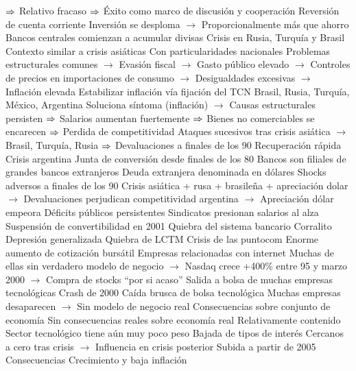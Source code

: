 \documentclass{nuevotema}
\begin{document}
\begin{esquemal}
				\4[] $\then$ Relativo fracaso
				\4[] $\then$ Éxito como marco de discusión y cooperación
				\4 Reversión de cuenta corriente
				\4[] Inversión se desploma
				\4[] $\to$ Proporcionalmente más que ahorro
				\4[] Bancos centrales comienzan a acumular divisas
			\3 Crisis en Rusia, Turquía y Brasil
				\4 Contexto similar a crisis asiáticas
				\4[] Con particularidades nacionales
				\4[] Problemas estructurales comunes
				\4[] $\to$ Evasión fiscal
				\4[] $\to$ Gasto público elevado
				\4[] $\to$ Controles de precios en importaciones de consumo
				\4[] $\to$ Desigualdades excesivas
				\4[] $\to$ Inflación elevada
				\4 Estabilizar inflación vía fijación del TCN
				\4[] Brasil, Rusia, Turquía, México, Argentina
				\4[] Soluciona síntoma (inflación)
				\4[] $\to$ Causas estructurales persisten
				\4[] $\then$ Salarios aumentan fuertemente
				\4[] $\then$ Bienes no comerciables se encarecen
				\4[] $\then$ Perdida de competitividad
				\4 Ataques sucesivos tras crisis asiática
				\4[] $\to$ Brasil, Turquía, Rusia
				\4[] $\then$ Devaluaciones a finales de los 90
				\4 Recuperación rápida
			\3 Crisis argentina
				\4 Junta de conversión desde finales de los 80
				\4 Bancos son filiales de grandes bancos extranjeros
				\4 Deuda extranjera denominada en dólares
				\4 Shocks adversos a finales de los 90
				\4[] Crisis asiática + rusa + brasileña + apreciación dolar
				\4[] $\to$ Devaluaciones perjudican competitividad argentina
				\4[] $\to$ Apreciación dólar empeora
				\4 Déficits públicos persistentes
				\4 Sindicatos presionan salarios al alza
				\4 Suspensión de convertibilidad en 2001
				\4 Quiebra del sistema bancario
				\4 Corralito
				\4[$\then$] Depresión generalizada
				\4 Quiebra de LCTM
			\3 Crisis de las puntocom
				\4 Enorme aumento de cotización bursátil
				\4[] Empresas relacionadas con internet
				\4[] Muchas de ellas sin verdadero modelo de negocio
				\4[] $\to$ Nasdaq crece +400\% entre 95 y marzo 2000
				\4[] $\to$ Compra de stocks ``por si acaso''
				\4[] Salida a bolsa de muchas empresas tecnológicas
				\4 Crash de 2000
				\4[] Caída brusca de bolsa tecnológica
				\4[] Muchas empresas desaparecen
				\4[] $\to$ Sin modelo de negocio real
				\4 Consecuencias sobre conjunto de economía
				\4[] Sin consecuencias reales sobre economía real
				\4[] Relativamente contenido
				\4[] Sector tecnológico tiene aún muy poco peso
				\4 Bajada de tipos de interés
				\4[] Cercanos a cero tras crisis
				\4[] $\to$ Influencia en crisis posterior
				\4[] Subida a partir de 2005
		\2 Consecuencias
			\3 Crecimiento y baja inflación

\end{esquemal}
\end{document}
